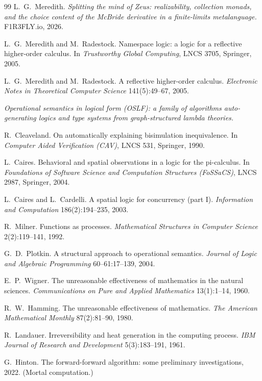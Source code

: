 \begin{thebibliography}{99}
L.\ G.\ Meredith. \emph{Splitting the mind of Zeus: realizability, collection monads, and the choice content of the McBride derivative in a finite-limits metalanguage.} F1R3FLY.io, 2026.

L.\ G.\ Meredith and M.\ Radestock. Namespace logic: a logic for a reflective higher-order calculus. In \emph{Trustworthy Global Computing}, LNCS 3705, Springer, 2005.

L.\ G.\ Meredith and M.\ Radestock. A reflective higher-order calculus. \emph{Electronic Notes in Theoretical Computer Science} 141(5):49--67, 2005.

\emph{Operational semantics in logical form (OSLF): a family of algorithms auto-generating logics and type systems from graph-structured lambda theories.}

R.\ Cleaveland. On automatically explaining bisimulation inequivalence. In \emph{Computer Aided Verification (CAV)}, LNCS 531, Springer, 1990.

L.\ Caires. Behavioral and spatial observations in a logic for the pi-calculus. In \emph{Foundations of Software Science and Computation Structures (FoSSaCS)}, LNCS 2987, Springer, 2004.

L.\ Caires and L.\ Cardelli. A spatial logic for concurrency (part I). \emph{Information and Computation} 186(2):194--235, 2003.

R.\ Milner. Functions as processes. \emph{Mathematical Structures in Computer Science} 2(2):119--141, 1992.

G.\ D.\ Plotkin. A structural approach to operational semantics. \emph{Journal of Logic and Algebraic Programming} 60--61:17--139, 2004.

E.\ P.\ Wigner. The unreasonable effectiveness of mathematics in the natural sciences. \emph{Communications on Pure and Applied Mathematics} 13(1):1--14, 1960.

R.\ W.\ Hamming. The unreasonable effectiveness of mathematics. \emph{The American Mathematical Monthly} 87(2):81--90, 1980.

R.\ Landauer. Irreversibility and heat generation in the computing process. \emph{IBM Journal of Research and Development} 5(3):183--191, 1961.

G.\ Hinton. The forward-forward algorithm: some preliminary investigations, 2022. (Mortal computation.)


\end{thebibliography}

